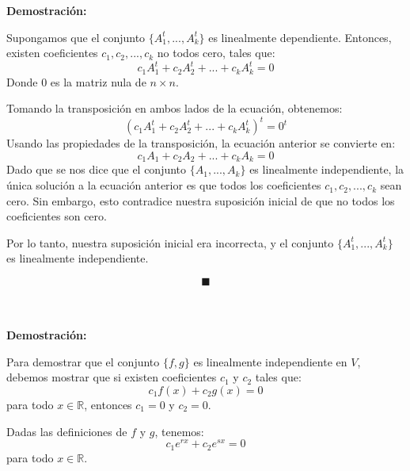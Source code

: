 \documentclass{article}
\begin{document}
\textbf{Demostración:}

Supongamos que el conjunto \( \{A_{1}^{t},...,A_{k}^{t}\} \) es linealmente dependiente. Entonces, existen coeficientes \( c_1, c_2, ..., c_k \) no todos cero, tales que:
\[ c_1 A_{1}^{t} + c_2 A_{2}^{t} + ... + c_k A_{k}^{t} = 0 \]
Donde \( 0 \) es la matriz nula de \( n \times n \).

Tomando la transposición en ambos lados de la ecuación, obtenemos:
\[ (c_1 A_{1}^{t} + c_2 A_{2}^{t} + ... + c_k A_{k}^{t})^t = 0^t \]
Usando las propiedades de la transposición, la ecuación anterior se convierte en:
\[ c_1 A_1 + c_2 A_2 + ... + c_k A_k = 0 \]
Dado que se nos dice que el conjunto \( \{A_1,...,A_k\} \) es linealmente independiente, la única solución a la ecuación anterior es que todos los coeficientes \( c_1, c_2, ..., c_k \) sean cero. Sin embargo, esto contradice nuestra suposición inicial de que no todos los coeficientes son cero.

Por lo tanto, nuestra suposición inicial era incorrecta, y el conjunto \( \{A_{1}^{t},...,A_{k}^{t}\} \) es linealmente independiente.

\[ \blacksquare \]

  \\ \\

\textbf{Demostración:}

Para demostrar que el conjunto \( \{f, g\} \) es linealmente independiente en \( V \), debemos mostrar que si existen coeficientes \( c_1 \) y \( c_2 \) tales que:
\[ c_1 f(x) + c_2 g(x) = 0 \]
para todo \( x \in \mathbb{R} \), entonces \( c_1 = 0 \) y \( c_2 = 0 \).

Dadas las definiciones de \( f \) y \( g \), tenemos:
\[ c_1 e^{rx} + c_2 e^{sx} = 0 \]
para todo \( x \in \mathbb{R} \).
\end{document}
